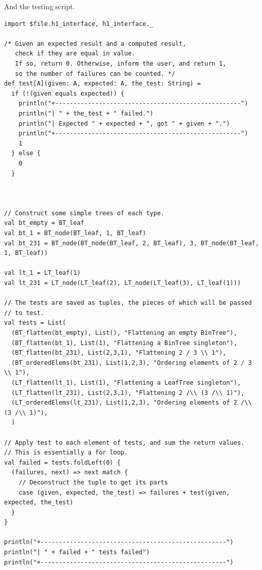 \documentclass[11pt]{article}
\begin{document}
And the testing script.
\begin{verbatim}
import $file.h1_interface, h1_interface._

/* Given an expected result and a computed result,
   check if they are equal in value.
   If so, return 0. Otherwise, inform the user, and return 1,
   so the number of failures can be counted. */
def test[A](given: A, expected: A, the_test: String) =
  if (!(given equals expected)) {
    println("+---------------------------------------------------")
    println("| " + the_test + " failed.")
    println("| Expected " + expected + ", got " + given + ".")
    println("+---------------------------------------------------")
    1
  } else {
    0
  }



// Construct some simple trees of each type.
val bt_empty = BT_leaf
val bt_1 = BT_node(BT_leaf, 1, BT_leaf)
val bt_231 = BT_node(BT_node(BT_leaf, 2, BT_leaf), 3, BT_node(BT_leaf, 1, BT_leaf))

val lt_1 = LT_leaf(1)
val lt_231 = LT_node(LT_leaf(2), LT_node(LT_leaf(3), LT_leaf(1)))

// The tests are saved as tuples, the pieces of which will be passed
// to test.
val tests = List(
  (BT_flatten(bt_empty), List(), "Flattening an empty BinTree"),
  (BT_flatten(bt_1), List(1), "Flattening a BinTree singleton"),
  (BT_flatten(bt_231), List(2,3,1), "Flattening 2 / 3 \\ 1"),
  (BT_orderedElems(bt_231), List(1,2,3), "Ordering elements of 2 / 3 \\ 1"),
  (LT_flatten(lt_1), List(1), "Flattening a LeafTree singleton"),
  (LT_flatten(lt_231), List(2,3,1), "Flattening 2 /\\ (3 /\\ 1)"),
  (LT_orderedElems(lt_231), List(1,2,3), "Ordering elements of 2 /\\ (3 /\\ 1)"),
  )

// Apply test to each element of tests, and sum the return values.
// This is essentially a for loop.
val failed = tests.foldLeft(0) {
  (failures, next) => next match {
    // Deconstruct the tuple to get its parts
    case (given, expected, the_test) => failures + test(given, expected, the_test)
  }
}

println("+---------------------------------------------------")
println("| " + failed + " tests failed")
println("+---------------------------------------------------")
\end{verbatim}
\end{document}
